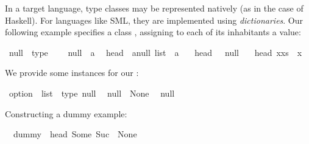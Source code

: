 \begin{isabellebody}
\begin{isamarkuptext}
  In a target language, type classes may be represented
  natively (as in the case of Haskell).  For languages
  like SML, they are implemented using \emph{dictionaries}.
  Our following example specifies a class ,
  assigning to each of its inhabitants a  value:%
\end{isamarkuptext}%
\isamarkuptrue%
\isamarkupfalse%
\ null\ {\isacharequal}\ type\ {\isacharplus}\isanewline
\ \ \ null\ {\isacharcolon}{\isacharcolon}\ {\isacharprime}a\isanewline
\isanewline
{}\isamarkupfalse%
\isanewline
\ \ head\ {\isacharcolon}{\isacharcolon}\ {\isachardoublequoteopen}{\isacharprime}a{\isasymColon}null\ list\ {\isasymRightarrow}\ {\isacharprime}a{\isachardoublequoteclose}\ \isanewline
\ \ {\isachardoublequoteopen}head\ {\isacharbrackleft}{\isacharbrackright}\ {\isacharequal}\ null{\isachardoublequoteclose}\isanewline
\ \ {\isacharbar}\ {\isachardoublequoteopen}head\ {\isacharparenleft}x{\isacharhash}xs{\isacharparenright}\ {\isacharequal}\ x{\isachardoublequoteclose}%
\begin{isamarkuptext}%
\noindent  We provide some instances for our :%
\end{isamarkuptext}%
\isamarkuptrue%
\isamarkupfalse%
\ option\ \ list\ {\isacharcolon}{\isacharcolon}\ {\isacharparenleft}type{\isacharparenright}\ null\isanewline
{}\isanewline
\isanewline
{}\isamarkupfalse%
\isanewline
\ \ {\isachardoublequoteopen}null\ {\isacharequal}\ None{\isachardoublequoteclose}\isanewline
\isanewline
{}\isamarkupfalse%
\isanewline
\ \ {\isachardoublequoteopen}null\ {\isacharequal}\ {\isacharbrackleft}{\isacharbrackright}{\isachardoublequoteclose}\isanewline
\isanewline
{}\isamarkupfalse%
%
\isadelimproof
\ %
\endisadelimproof
%
\isatagproof
\isacommand{{\isachardot}{\isachardot}}\isamarkupfalse%
%
\endisatagproof
{\isafoldproof}%
%
\isadelimproof
%
\endisadelimproof
\isanewline
\isanewline
{}\isamarkupfalse%
%
\begin{isamarkuptext}%
\noindent Constructing a dummy example:%
\end{isamarkuptext}%
\isamarkuptrue%
\isamarkupfalse%
\isanewline
\ \ {\isachardoublequoteopen}dummy\ {\isacharequal}\ head\ {\isacharbrackleft}Some\ {\isacharparenleft}Suc\ {}{\isacharparenright}{\isacharcomma}\ None{\isacharbrackright}{\isachardoublequoteclose}%
\begin{isamarkuptext}%

\end{isamarkuptext}
\end{isabellebody}
